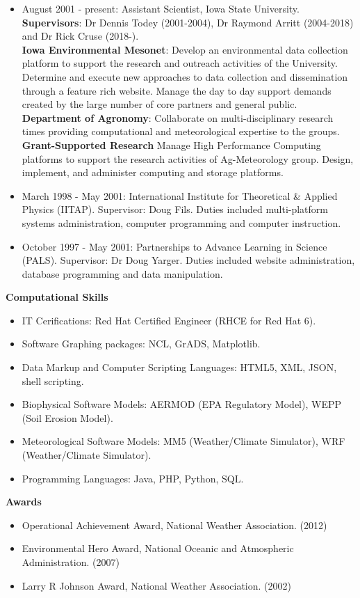 \begin{itemize}
\item August 2001 - present: Assistant Scientist, Iowa State University.\\
 \textbf{Supervisors}: Dr Dennis Todey (2001-2004), Dr Raymond Arritt (2004-2018) and Dr Rick Cruse (2018-).  \\
\textbf{Iowa Environmental Mesonet}: Develop an environmental data collection
platform to support the research and outreach activities of the University.
Determine and execute new approaches to data collection and dissemination 
through a feature rich website.  Manage the day to day support demands 
created by the large number of core partners and general public. \\
\textbf{Department of Agronomy}: Collaborate on multi-disciplinary research
times providing computational and meteorological expertise to the groups. \\
\textbf{Grant-Supported Research} Manage High Performance Computing platforms
to support the research activities of Ag-Meteorology group.  Design, 
implement, and administer computing and storage platforms.
\item March 1998 - May 2001: International Institute for Theoretical \& Applied 
Physics (IITAP).  Supervisor: Doug Fils. Duties included multi-platform 
systems administration, computer programming and computer instruction.
\item October 1997 - May 2001: Partnerships to Advance Learning in Science
(PALS).  Supervisor: Dr Doug Yarger.  Duties included website administration,
database programming and data manipulation.
\end{itemize}
%
\Large \bf Computational Skills
\normalsize \sf
\begin{itemize}
\item IT Cerifications: Red Hat Certified Engineer (RHCE for Red Hat 6).
\item Software Graphing packages: NCL, GrADS, Matplotlib.
\item Data Markup and Computer Scripting Languages: HTML5, XML, JSON, shell scripting.
\item Biophysical Software Models: AERMOD (EPA Regulatory Model), WEPP (Soil Erosion Model).
\item Meteorological Software Models: MM5 (Weather/Climate Simulator), WRF (Weather/Climate Simulator).
\item Programming Languages: Java, PHP, Python, SQL.
\end{itemize} 
%
\normalsize \sf
\Large \bf Awards
\normalsize \sf
\begin{itemize}
\item Operational Achievement Award, National Weather Association. (2012)
\item Environmental Hero Award, National Oceanic and Atmospheric Administration. (2007)
\item Larry R Johnson Award, National Weather Association. (2002)
\end{itemize}



